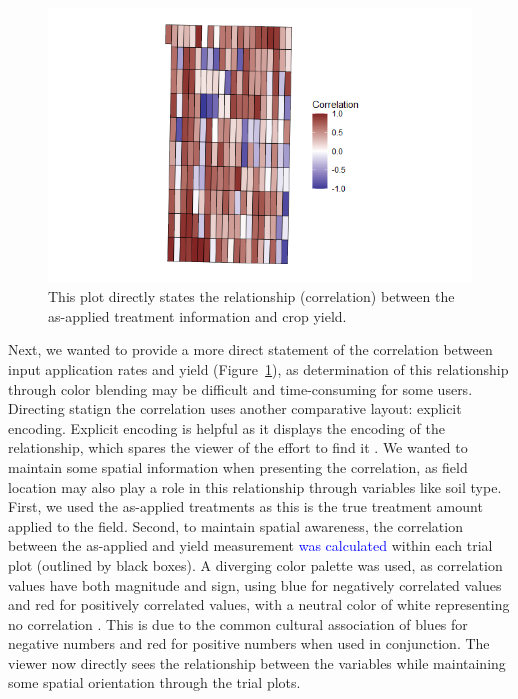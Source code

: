 \documentclass[
  authoryear,
  preprint,
  3p]{elsarticle}
\newcommand{\svp}[1]{{\textcolor{blue}{#1}}}
\begin{document}
\begin{figure}

{\centering \includegraphics{../images/paper/corr-plot2.png}

}

\caption{\label{fig-redesign3}This plot directly states the relationship
(correlation) between the as-applied treatment information and crop
yield.}

\end{figure}

Next, we wanted to provide a more direct statement of the correlation
between input application rates and yield (Figure~\ref{fig-redesign3}),
as determination of this relationship through color blending may be
difficult and time-consuming for some users. Directing statign the
correlation uses another comparative layout: explicit encoding. Explicit
encoding is helpful as it displays the encoding of the relationship,
which spares the viewer of the effort to find it \citep{gleicher2011}.
We wanted to maintain some spatial information when presenting the
correlation, as field location may also play a role in this relationship
through variables like soil type. First, we used the as-applied
treatments as this is the true treatment amount applied to the field.
Second, to maintain spatial awareness, the correlation between the
as-applied and yield measurement \svp{was calculated} within each trial
plot (outlined by black boxes). A diverging color palette was used, as
correlation values have both magnitude and sign, using blue for
negatively correlated values and red for positively correlated values,
with a neutral color of white representing no correlation
\citep{macdonald_1999}. This is due to the common cultural association
of blues for negative numbers and red for positive numbers when used in
conjunction. The viewer now directly sees the relationship between the
variables while maintaining some spatial orientation through the trial
plots.
\end{document}
